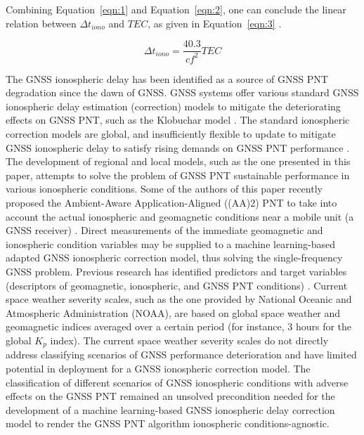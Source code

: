 \let\LaTeXcline\cline\documentclass[sn-mathphys-num]{sn-jnl}\let\cline\LaTeXcline
\begin{document}
Combining Equation~\ref{eqn:1} and Equation~\ref{eqn:2}, one can conclude the linear relation between $\Delta t_{iono}$ and $TEC$, as given in Equation~\ref{eqn:3} \cite{spilker1996global}.

\begin{equation}
	\Delta t_{iono} = \frac{40.3}{c f^{2}} TEC
	\label{eqn:3}
\end{equation}

The GNSS ionospheric delay has been identified as a source of GNSS PNT degradation since the dawn of GNSS. GNSS systems offer various standard GNSS ionospheric delay estimation (correction) models to mitigate the deteriorating effects on GNSS PNT, such as the Klobuchar model \cite{spilker1996global, klobuchar1987ionospheric}. The standard ionospheric correction models are global, and insufficiently flexible to update to mitigate GNSS ionospheric delay to satisfy rising demands on GNSS PNT performance \cite{spilker1996global, enge1994global}. The development of regional and local models, such as the one presented in this paper, attempts to solve the problem of GNSS PNT sustainable performance in various ionospheric conditions. Some of the authors of this paper recently proposed the Ambient-Aware Application-Aligned ((AA)2) PNT to take into account the actual ionospheric and geomagnetic conditions near a mobile unit (a GNSS receiver) \cite{filjar2024ambient}. Direct measurements of the immediate geomagnetic and ionospheric condition variables may be supplied to a machine learning-based adapted GNSS ionospheric correction model, thus solving the single-frequency GNSS problem. Previous research has identified predictors and target variables (descriptors of geomagnetic, ionospheric, and GNSS PNT conditions) \cite{natras2022ensemble, natras2023regional}. Current space weather severity scales, such as the one provided by National Oceanic and Atmospheric Administration (NOAA), are based on global space weather and geomagnetic indices averaged over a certain period (for instance, $3$ hours for the global $K_{p}$ index). The current space weather severity scales do not directly address classifying scenarios of GNSS performance deterioration and have limited potential in deployment for a GNSS ionospheric correction model. The classification of different scenarios of GNSS ionospheric conditions with adverse effects on the GNSS PNT remained an unsolved precondition needed for the development of a machine learning-based GNSS ionospheric delay correction model to render the GNSS PNT algorithm ionospheric conditions-agnostic.
\end{document}
